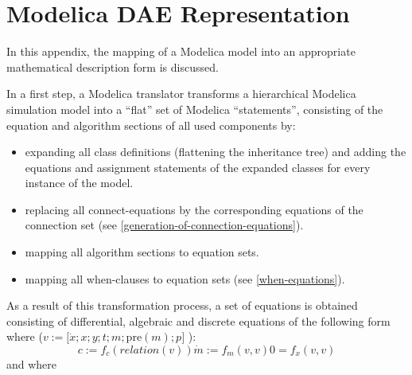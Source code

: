 \chapter{Modelica DAE Representation}

In this appendix, the mapping of a Modelica model into an appropriate
mathematical description form is discussed.

In a first step, a Modelica translator transforms a hierarchical
Modelica simulation model into a ``flat'' set of Modelica
``statements'', consisting of the equation and algorithm sections of all
used components by:

\begin{itemize}
\item
  expanding all class definitions (flattening the inheritance tree) and
  adding the equations and assignment statements of the expanded classes
  for every instance of the model.
\item
  replacing all connect-equations by the corresponding equations of the
  connection set (see \autoref{generation-of-connection-equations}).
\item
  mapping all algorithm sections to equation sets.
\item
  mapping all when-clauses to equation sets (see \autoref{when-equations}).
\end{itemize}

As a result of this transformation process, a set of equations is
obtained consisting of differential, algebraic and discrete equations of
the following form where ($v:=\lbrack \dot{x}; x; y; t; m; \text{pre}(m); p\rbrack$ ):
\begin{subequations}
\begin{equation}
c:=f_c(relation(v))\label{eq:crossing}
\end{equation}
\begin{equation}
\dot{m}:=f_m(v, v)
\end{equation}
\begin{equation}
0=f_x(v, v)\label{eq:dae}
\end{equation}
\label{eq:hydrid-dae}
\end{subequations}
and where

